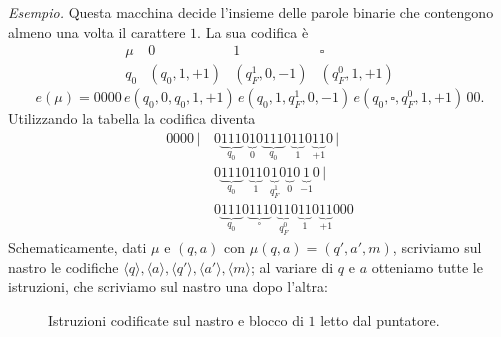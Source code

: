 \medskip
\noindent\emph{Esempio.} Questa macchina decide l'insieme delle parole binarie che contengono almeno una volta il carattere $1$. La sua codifica è
\[
\begin{array}{c|c|c|c}
\mu & 0 & 1 & \square\\\hline
q_0 & (q_0,1,+1) & (q_F^1,0,-1) & (q_F^0,1,+1)
\end{array}
\]
\[
e(\mu)=0000\,e(q_0,0,q_0,1,+1)\,e(q_0,1,q_F^1,0,-1)\,e(q_0,\square,q_F^0,1,+1)\,00.
\]
Utilizzando la tabella la codifica diventa
\begin{align*}
0000\,|\,&0\underbrace{111}_{q_0}0\underbrace{1}_{0}0\underbrace{111}_{q_0}0\underbrace{11}_{1}0\underbrace{11}_{+1}0\,|\\
&0\underbrace{111}_{q_0}0\underbrace{11}_{1}0\underbrace{1}_{q_F^1}0\underbrace{1}_{0}0\underbrace{1}_{-1}0\,|\\
&0\underbrace{111}_{q_0}0\underbrace{111}_{\square}0\underbrace{11}_{q_F^0}0\underbrace{11}_{1}0\underbrace{11}_{+1}000
\end{align*}
Schematicamente, dati $\mu$ e $(q,a)$ con $\mu(q,a)=(q',a',m)$, scriviamo sul nastro le codifiche $\langle q\rangle,\langle a\rangle,\langle q'\rangle,\langle a'\rangle,\langle m\rangle$; al variare di $q$ e $a$ otteniamo tutte le istruzioni, che scriviamo sul nastro una dopo l'altra:

\begin{figure}[H]
\centering
{}
\caption{Istruzioni codificate sul nastro e blocco di $1$ letto dal puntatore.}
\label{fig:nastro-universale}
\end{figure}

